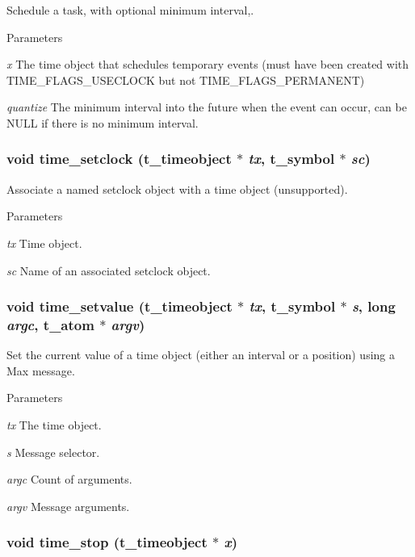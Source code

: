 Schedule a task, with optional minimum interval,. 
\begin{DoxyParams}{Parameters}
\item[{\em x}]The time object that schedules temporary events (must have been created with TIME\_\-FLAGS\_\-USECLOCK but not TIME\_\-FLAGS\_\-PERMANENT) \item[{\em quantize}]The minimum interval into the future when the event can occur, can be NULL if there is no minimum interval. \end{DoxyParams}
\hypertarget{group__time_ga380cbe3efa2240446cb1cc2ef1195876}{
\subsubsection[{time\_\-setclock}]{\setlength{\rightskip}{0pt plus 5cm}void time\_\-setclock ({\bf t\_\-timeobject} $\ast$ {\em tx}, \/  {\bf t\_\-symbol} $\ast$ {\em sc})}}
\label{group__time_ga380cbe3efa2240446cb1cc2ef1195876}


Associate a named setclock object with a time object (unsupported). 
\begin{DoxyParams}{Parameters}
\item[{\em tx}]Time object. \item[{\em sc}]Name of an associated setclock object. \end{DoxyParams}
\hypertarget{group__time_ga7451e479ce77e4dcf7a13bbd933575ed}{
\subsubsection[{time\_\-setvalue}]{\setlength{\rightskip}{0pt plus 5cm}void time\_\-setvalue ({\bf t\_\-timeobject} $\ast$ {\em tx}, \/  {\bf t\_\-symbol} $\ast$ {\em s}, \/  long {\em argc}, \/  {\bf t\_\-atom} $\ast$ {\em argv})}}
\label{group__time_ga7451e479ce77e4dcf7a13bbd933575ed}


Set the current value of a time object (either an interval or a position) using a Max message. 
\begin{DoxyParams}{Parameters}
\item[{\em tx}]The time object. \item[{\em s}]Message selector. \item[{\em argc}]Count of arguments. \item[{\em argv}]Message arguments. \end{DoxyParams}
\hypertarget{group__time_ga6724fc34703298b8dbb12cfe17ef325e}{
\subsubsection[{time\_\-stop}]{\setlength{\rightskip}{0pt plus 5cm}void time\_\-stop ({\bf t\_\-timeobject} $\ast$ {\em x})}}
\label{group__time_ga6724fc34703298b8dbb12cfe17ef325e}


